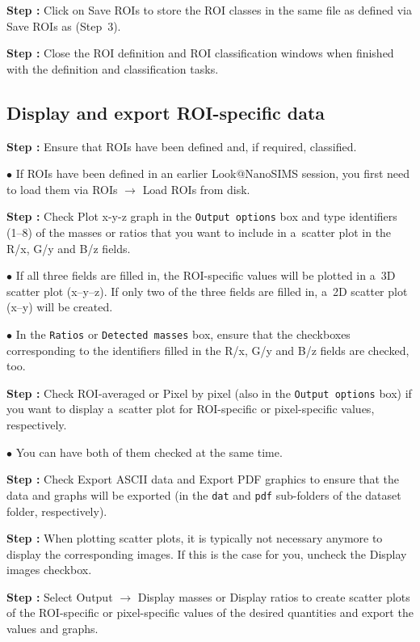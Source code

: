 \documentclass[a4paper, 11pt]{article}
\newcommand{\ttt}[1]{\texttt{#1}}
\newcommand{\lans}[1]{{\color{magenta}#1}}
\newcommand{\lanscb}[1]{{\color{darkgreen}#1}}
\newcommand{\lanstf}[1]{{\color{cyan}#1}}
\newcommand\ra{\rightarrow}
\newcounter{step}
\newcommand\s{\addtocounter{step}{1}\noindent\textbf{Step \thestep:}{ }}
\newcommand\bul{\noindent$\bullet${ }}
\begin{document}
\s Click on \lans{Save ROIs} to store the ROI classes in the same file as defined via \lans{Save ROIs as} (Step~3).

\s Close the ROI definition and ROI classification windows when finished with the definition and classification tasks.


\subsection{Display and export ROI-specific data}
\setcounter{step}{0}

\s Ensure that ROIs have been defined and, if required, classified.

\bul If ROIs have been defined in an earlier Look@NanoSIMS session, you first need to load them via \lans{ROIs} $\ra$ \lans{Load ROIs from disk}.

\s Check \lanscb{Plot x-y-z graph} in the \ttt{Output options} box and type identifiers (1--8) of the masses or ratios that you want to include in a~scatter plot in the \lanstf{R/x}, \lanstf{G/y} and \lanstf{B/z} fields. 

\bul If all three fields are filled in, the ROI-specific values will be plotted in a~3D scatter plot (x--y--z). If only two of the three fields are filled in, a~2D scatter plot (x--y) will be created.

\bul In the \ttt{Ratios} or \ttt{Detected masses} box, ensure that the checkboxes corresponding to the identifiers filled in the \lanstf{R/x}, \lanstf{G/y} and \lanstf{B/z} fields are checked, too. 

\s Check \lanscb{ROI-averaged} or \lanscb{Pixel by pixel} (also in the \ttt{Output options} box) if you want to display a~scatter plot for ROI-specific or pixel-specific values, respectively.

\bul You can have both of them checked at the same time. 

\s Check \lanscb{Export ASCII data} and \lanscb{Export PDF graphics} to ensure that the data and graphs will be exported (in the \ttt{dat} and \ttt{pdf} sub-folders of the dataset folder, respectively).

\s When plotting scatter plots, it is typically not necessary anymore to display the corresponding images. If this is the case for you, uncheck the \lanscb{Display images} checkbox.

\s Select \lans{Output} $\ra$ \lans{Display masses} or \lans{Display ratios} to create scatter plots of the ROI-specific or pixel-specific values of the desired quantities and export the values and graphs.
\end{document}
